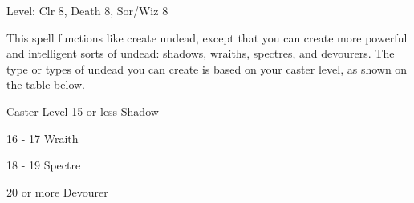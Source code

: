 
\begin{description*}
\item[Level:] Clr 8, Death 8, Sor/Wiz 8
\end{description*}

This spell functions like create undead, except that you can create more powerful
and intelligent sorts of undead: shadows, wraiths, spectres, and devourers. The
type or types of undead you can create is based on your caster level, as shown
on the table below.
\begin{description*}
\item[Caster Level 15 or less] Shadow
\item[16 - 17] Wraith
\item[18 - 19] Spectre
\item[20 or more] Devourer
\end{description*}